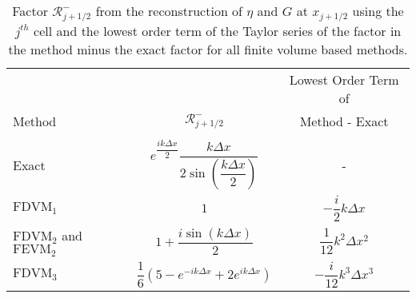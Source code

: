 \begin{table}
	\centering
	\begin{tabular}{l  c  c}
		&&Lowest Order Term of	\\
		Method& $\mathcal{R}^-_{j+1/2}$ &  Method - Exact\B \\
		\hline \\
		Exact & $e^{\dfrac{ik\Delta x}{2}} \dfrac{k\Delta x}{2 \sin\left(\dfrac{k \Delta x}{2}\right)}$ & - \B \\
		$\text{FDVM}_1$& $1$ & $-\dfrac{i}{2}k \Delta x$  \T\B \\
		$\text{FDVM}_2$ and $\text{FEVM}_2$& $1 +  \dfrac{i \sin\left(k\Delta x \right)}{2}$ & $\dfrac{1}{12}k^2 \Delta x^2$  \T\B \\
		$\text{FDVM}_3$& $\dfrac{1}{6}\left({5 - e^{-i k {\Delta x}} +2 e^{i k {\Delta x}}} \right)$ & $-\dfrac{i}{12}k^3 \Delta x^3$  \T\B \\
		\hline
	\end{tabular}
	\caption{Factor $\mathcal{R}^-_{j+1/2}$ from the reconstruction of $\eta$ and $G$ at $x_{j+1/2}$ using the ${j^{th}}$ cell and the lowest order term of the Taylor series of the factor in the method minus the exact factor for all finite volume based methods.}
	\label{tab:Rmfactor}
\end{table}
